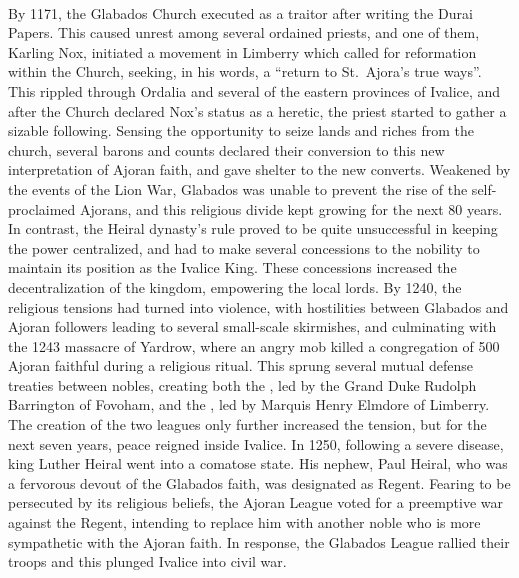 %
%
\\
By 1171, the Glabados Church executed  as a traitor after writing the Durai Papers. 
This caused unrest among several ordained priests, and one of them, Karling Nox, initiated a movement in Limberry which called for reformation within the Church, seeking, in his words, a “return to St.~Ajora’s true ways”. 
This rippled through Ordalia and several of the eastern provinces of Ivalice, and after the Church declared Nox’s status as a heretic, the priest started to gather a sizable following. 
Sensing the opportunity to seize lands and riches from the church, several barons and counts declared their conversion to this new interpretation of Ajoran faith, and gave shelter to the new converts.
Weakened by the events of the Lion War, Glabados was unable to prevent the rise of the self-proclaimed Ajorans, and this religious divide kept growing for the next 80 years. In contrast, the Heiral dynasty's rule proved to be quite unsuccessful in keeping the power centralized, and had to make several concessions to the nobility to maintain its position as the Ivalice King.
These concessions increased the decentralization of the kingdom, empowering the local lords.
By 1240, the religious tensions had turned into violence, with hostilities between Glabados and Ajoran followers leading to several small-scale skirmishes, and culminating with the 1243 massacre of Yardrow, where an angry mob killed a congregation of 500 Ajoran faithful during a religious ritual. 
This sprung several mutual defense treaties between nobles, creating both the , led by the Grand Duke Rudolph Barrington of Fovoham, and the , led by Marquis Henry Elmdore of Limberry. 
The creation of the two leagues only further increased the tension, but for the next seven years, peace reigned inside Ivalice.
In 1250, following a severe disease, king Luther Heiral went into a comatose state. 
His nephew, Paul Heiral, who was a fervorous devout of the Glabados faith, was designated as Regent. 
Fearing to be persecuted by its religious beliefs, the Ajoran League voted for a preemptive war against the Regent, intending to replace him with another noble who is more sympathetic with the Ajoran faith. 
In response, the Glabados League rallied their troops and this plunged Ivalice into civil war.
%
\vfill
